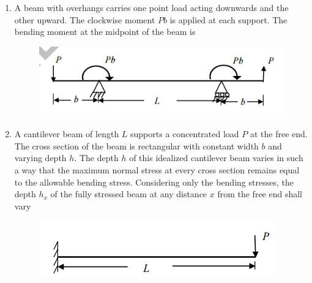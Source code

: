\documentclass[a4paper,10pt]{article}
\begin{document}
\begin{enumerate}
    \hfill{}
    
    \item A beam with overhangs carries one point load acting downwards and the other upward. The clockwise moment $Pb$ is applied at each support. The bending moment at the midpoint of the beam is
    \begin{figure}[H] \centering \includegraphics[width=0.7\columnwidth]{q13_solid.png} \caption*{} \label{fig:q13_solid} \end{figure}
    
    \hfill{}
    \begin{enumerate}
    \end{enumerate}
    
    \item A cantilever beam of length $L$ supports a concentrated load $P$ at the free end. The cross section of the beam is rectangular with constant width $b$ and varying depth $h$. The depth $h$ of this idealized cantilever beam varies in such a way that the maximum normal stress at every cross section remains equal to the allowable bending stress. Considering only the bending stresses, the depth $h_x$ of the fully stressed beam at any distance $x$ from the free end shall vary
    \begin{figure}[H] \centering \includegraphics[width=0.6\columnwidth]{q14_solid.png} \caption*{} \label{fig:q14_solid} \end{figure}
    
    \hfill{}
    \begin{enumerate}
    \end{enumerate}
    

\end{enumerate}
\end{document}
